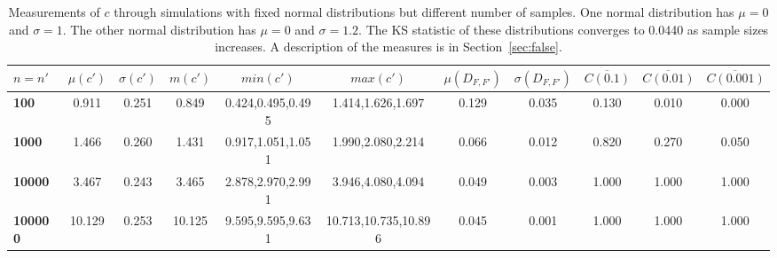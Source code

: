 \begin{table*}[h!]
\caption{Measurements of $c$ through simulations
        with fixed normal distributions but different number of samples.
        One normal distribution has $\mu=0$ and $\sigma=1$.
        The other normal distribution has
        $\mu=0$ and $\sigma=1.2$.
        The KS statistic of these distributions converges
        to 0.0440 as sample sizes increases.
	A description of the measures is in Section~\ref{sec:false}.
	}\label{tab:false2}
\tiny
\begin{center}
\begin{tabular}{ l | c | c | c | c | c | c | c | c | c | c }
$n=n'$ & $\mu(c')$ & $\sigma(c')$ & $m(c')$ & $min(c')$ & $max(c')$ & $\mu(D_{F,F'})$ & $\sigma(D_{F,F'})$ & $\overline{C(0.1)}$ & $\overline{C(0.01)}$ & $\overline{C(0.001)}$ \\\hline
{\bf 100} & 0.911 & 0.251 & 0.849 & 0.424,0.495,0.495 & 1.414,1.626,1.697 & 0.129 & 0.035 & 0.130 & 0.010 & 0.000 \\
{\bf 1000} & 1.466 & 0.260 & 1.431 & 0.917,1.051,1.051 & 1.990,2.080,2.214 & 0.066 & 0.012 & 0.820 & 0.270 & 0.050 \\\hline
{\bf 10000} & 3.467 & 0.243 & 3.465 & 2.878,2.970,2.991 & 3.946,4.080,4.094 & 0.049 & 0.003 & 1.000 & 1.000 & 1.000 \\
{\bf 100000} & 10.129 & 0.253 & 10.125 & 9.595,9.595,9.631 & 10.713,10.735,10.896 & 0.045 & 0.001 & 1.000 & 1.000 & 1.000 \\
\end{tabular}
\end{center}
\end{table*}

